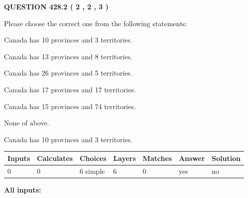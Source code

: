 \documentclass[12pt]{article}
\begin{document}
   
  
\vspace{0.2in}
  
{\textbf{\Large{QUESTION
428.2 
 ( 2 , 2 , 3 )
}}}
  
  
Please choose the correct one from the following statements:
 
 
Canada has 10  provinces and 3 territories.
 
 
Canada has  13 provinces and  8 territories.
 
 
Canada has  26 provinces and  5 territories.
 
 
Canada has  17 provinces and  17 territories.
 
 
Canada has  15 provinces and  74 territories.
 
 
 None of above.
 
 
\noindent{}
 
 
Canada has 10  provinces and 3 territories.
 
 
\noindent{}
 
 
   
   
   
   
\noindent\begin{tabular}{|l|l|l|l|l|l|l|}
 \hline
Inputs & Calculates & Choices & Layers & Matches & Answer & Solution \\ \hline
 0  & 
 0  & 
 6
  simple  
  & 
 6  & 
 0  & 
  yes & 
  no 
  \\ \hline
 \end{tabular}
   
   
   
   
\noindent{}
   
   
   
   
\noindent\vspace{0.1in}\hspace{-0.08in} {\textbf{\Large{All inputs: }}}
   
   
   
   
   
   
 \vspace{0.2in}
 
\end{document}
